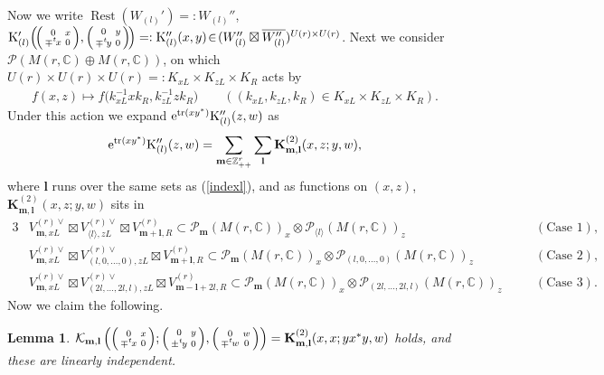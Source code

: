 \documentclass[pdftex]{sigma}
\numberwithin{equation}{section}
\newtheorem{Lemma}[Theorem]{Lemma}
\newcommand{\bK}{\mathbf{K}}
\newcommand{\bl}{\mathbf{l}}
\newcommand{\bm}{\mathbf{m}}
\newcommand{\BZ}{\mathbb{Z}}
\newcommand{\BC}{\mathbb{C}}
\newcommand{\cK}{\mathcal{K}}
\newcommand{\cP}{\mathcal{P}}
\newcommand{\rK}{\mathrm{K}}
\newcommand{\tr}{\operatorname{tr}}
\newcommand{\Rest}{\operatorname{Rest}}
\begin{document}
Now we write $\Rest(W_{(l)}')=:W_{(l)}''$, $\rK_{(l)}'\!\left(\!\Big(\begin{smallmatrix} 0&x\\\mp{}^t\hspace{-1pt}x&0 \end{smallmatrix}\Big),
\Big(\begin{smallmatrix} 0&y\\\mp{}^t\hspace{-1pt}y&0 \end{smallmatrix}\Big)\!\right)=:\rK_{(l)}''(x,y)
\!\in\! (W_{(l)}''\boxtimes\overline{W_{(l)}''})^{U(r)\times U(r)}$.
Next we consider $\cP(M(r,\BC)\oplus M(r,\BC))$, on which $U(r)\times U(r)\times U(r)=:K_{xL}\times K_{zL}\times K_R$ acts by
\begin{gather*} f(x,z)\mapsto f\big(k_{xL}^{-1}xk_R,k_{zL}^{-1}zk_R\big) \qquad ((k_{xL},k_{zL},k_R)\in K_{xL}\times K_{zL}\times K_R). \end{gather*}
Under this action we expand ${\rm e}^{\tr(xy^*)}\rK_{(l)}''(z,w)$ as
\begin{gather*} {\rm e}^{\tr(xy^*)}\rK_{(l)}''(z,w)=\sum_{\bm\in\BZ_{++}^r}\sum_\bl \bK_{\bm,\bl}^{(2)}(x,z;y,w), \end{gather*}
where $\bl$ runs over the same sets as (\ref{indexl}), and as functions on $(x,z)$, $\bK_{\bm,\bl}^{(2)}(x,z;y,w)$ sits in
\begin{alignat*}{3}
&V_{\bm,xL}^{(r)\vee}\boxtimes V_{\langle l\rangle,zL}^{(r)\vee}\boxtimes V_{\bm+\bl,R}^{(r)}
\subset \cP_\bm(M(r,\BC))_x\otimes\cP_{\langle l\rangle}(M(r,\BC))_z\quad & &(\text{Case }1),& \\
&V_{\bm,xL}^{(r)\vee}\boxtimes V_{(l,0,\ldots,0),zL}^{(r)\vee}\boxtimes V_{\bm+\bl,R}^{(r)}
\subset \cP_\bm(M(r,\BC))_x\otimes\cP_{(l,0,\ldots,0)}(M(r,\BC))_z \quad & &(\text{Case }2),& \\
&V_{\bm,xL}^{(r)\vee}\boxtimes V_{(2l,\ldots,2l,l),zL}^{(r)\vee}\boxtimes V_{\bm-\bl+2l,R}^{(r)}
\subset \cP_\bm(M(r,\BC))_x\otimes\cP_{(2l,\ldots,2l,l)}(M(r,\BC))_z \quad & &(\text{Case }3).&
\end{alignat*}
Now we claim the following.
\begin{Lemma}\label{lemma_suss}
$\cK_{\bm,\bl}\left(\Big(\begin{smallmatrix}0&x\\ \mp{}^t\hspace{-1pt}x&0\end{smallmatrix}\Big);
\Big(\begin{smallmatrix}0&y\\ \pm{}^t\hspace{-1pt}y&0\end{smallmatrix}\Big),\Big(\begin{smallmatrix}0&w\\ \mp{}^t\hspace{-1pt}w&0\end{smallmatrix}\Big)\right)
=\bK_{\bm,\bl}^{(2)}(x,x;yx^*y,w)$ holds, and these are linearly independent.
\end{Lemma}
\end{document}
